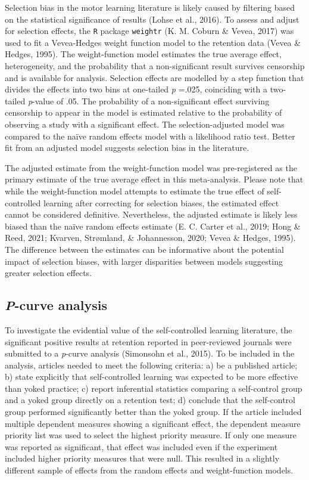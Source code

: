 \documentclass[
  english,
  man, donotrepeattitle,floatsintext]{apa7}
\begin{document}
Selection bias in the motor learning literature is likely caused by filtering based on the statistical significance of results (Lohse et al., 2016). To assess and adjust for selection effects, the \texttt{R} package \texttt{weightr} (K. M. Coburn \& Vevea, 2017) was used to fit a Vevea-Hedges weight function model to the retention data (Vevea \& Hedges, 1995). The weight-function model estimates the true average effect, heterogeneity, and the probability that a non-significant result survives censorship and is available for analysis. Selection effects are modelled by a step function that divides the effects into two bins at one-tailed \emph{p} =.025, coinciding with a two-tailed \emph{p}-value of .05. The probability of a non-significant effect surviving censorship to appear in the model is estimated relative to the probability of observing a study with a significant effect. The selection-adjusted model was compared to the naïve random effects model with a likelihood ratio test. Better fit from an adjusted model suggests selection bias in the literature.

The adjusted estimate from the weight-function model was pre-registered as the primary estimate of the true average effect in this meta-analysis. Please note that while the weight-function model attempts to estimate the true effect of self-controlled learning after correcting for selection biases, the estimated effect cannot be considered definitive. Nevertheless, the adjusted estimate is likely less biased than the naïve random effects estimate (E. C. Carter et al., 2019; Hong \& Reed, 2021; Kvarven, Strømland, \& Johannesson, 2020; Vevea \& Hedges, 1995). The difference between the estimates can be informative about the potential impact of selection biases, with larger disparities between models suggesting greater selection effects.

\hypertarget{p-curve-analysis}{%
\subsection{\texorpdfstring{\emph{P}-curve analysis}{P-curve analysis}}\label{p-curve-analysis}}

To investigate the evidential value of the self-controlled learning literature, the significant positive results at retention reported in peer-reviewed journals were submitted to a \emph{p}-curve analysis (Simonsohn et al., 2015). To be included in the analysis, articles needed to meet the following criteria: a) be a published article; b) state explicitly that self-controlled learning was expected to be more effective than yoked practice; c) report inferential statistics comparing a self-control group and a yoked group directly on a retention test; d) conclude that the self-control group performed significantly better than the yoked group. If the article included multiple dependent measures showing a significant effect, the dependent measure priority list was used to select the highest priority measure. If only one measure was reported as significant, that effect was included even if the experiment included higher priority measures that were null. This resulted in a slightly different sample of effects from the random effects and weight-function models.
\end{document}
